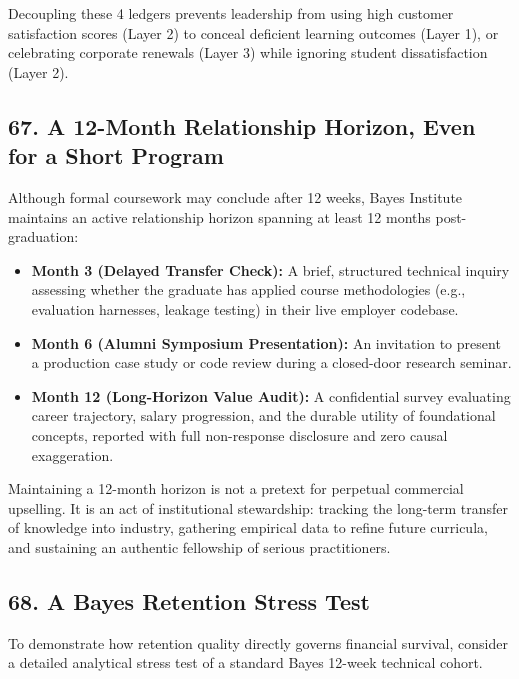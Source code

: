 Decoupling these 4 ledgers prevents leadership from using high customer satisfaction scores (Layer 2) to conceal deficient learning outcomes (Layer 1), or celebrating corporate renewals (Layer 3) while ignoring student dissatisfaction (Layer 2).

\subsection*{67. A 12-Month Relationship Horizon, Even for a Short Program}

Although formal coursework may conclude after 12 weeks, Bayes Institute maintains an active relationship horizon spanning at least 12 months post-graduation:
\begin{itemize}[leftmargin=*]
\item \textbf{Month 3 (Delayed Transfer Check):} A brief, structured technical inquiry assessing whether the graduate has applied course methodologies (e.g., evaluation harnesses, leakage testing) in their live employer codebase.
\item \textbf{Month 6 (Alumni Symposium Presentation):} An invitation to present a production case study or code review during a closed-door research seminar.
\item \textbf{Month 12 (Long-Horizon Value Audit):} A confidential survey evaluating career trajectory, salary progression, and the durable utility of foundational concepts, reported with full non-response disclosure and zero causal exaggeration.
\end{itemize}

Maintaining a 12-month horizon is not a pretext for perpetual commercial upselling. It is an act of institutional stewardship: tracking the long-term transfer of knowledge into industry, gathering empirical data to refine future curricula, and sustaining an authentic fellowship of serious practitioners.

\subsection*{68. A Bayes Retention Stress Test}

To demonstrate how retention quality directly governs financial survival, consider a detailed analytical stress test of a standard Bayes 12-week technical cohort.

